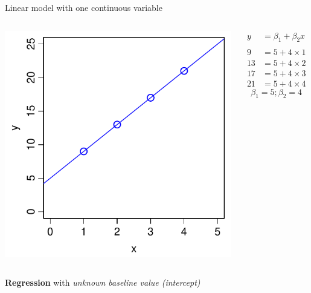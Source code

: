 \documentclass[xcolor=x11names,handout,compress]{beamer}
\renewcommand{\(}{\begin{columns}}
\renewcommand{\)}{\end{columns}}
\newcommand{\<}[1]{\begin{column}{#1}}
\renewcommand{\>}{\end{column}}
\begin{document}
    \begin{frame}{Linear model with one continuous variable}
    
    \begin{columns}[T]
    
            \includegraphics[width=\textwidth]{Intercept.pdf}
            
            \begin{align*}
              y  &= \beta_1 + \beta_2 x \\
              \\
              9  &= 5 + 4 \times 1 \\
              13 &= 5 + 4 \times 2 \\
              17 &= 5 + 4 \times 3 \\
              21 &= 5 + 4 \times 4   
            \end{align*}
            \[\beta_1 = 5; \beta_2=4\]
    \end{columns}
\pause
    \begin{center}
        {\bf Regression} with {\it unknown baseline value (intercept) }
    \end{center}
    
\end{frame}
\end{document}
